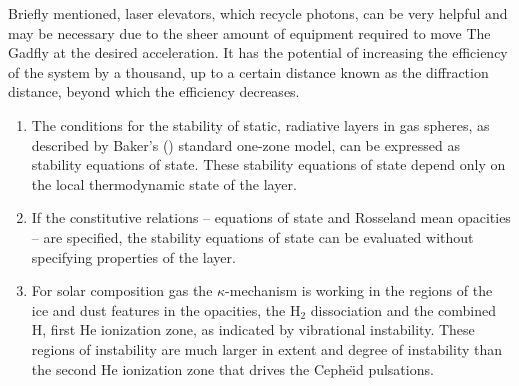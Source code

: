 \documentclass{aa}
\begin{document}
     Briefly mentioned, laser elevators, which recycle photons, can be very helpful and may be necessary due to the sheer amount of equipment required to move The Gadfly at the desired acceleration. It has the potential of increasing the efficiency of the system by a thousand, up to a certain distance known as the diffraction distance, beyond which the efficiency decreases.
   \begin{enumerate}
      \item The conditions for the stability of static, radiative
         layers in gas spheres, as described by Baker's (\cite{baker})
         standard one-zone model, can be expressed as stability
         equations of state. These stability equations of state depend
         only on the local thermodynamic state of the layer.
      \item If the constitutive relations -- equations of state and
         Rosseland mean opacities -- are specified, the stability
         equations of state can be evaluated without specifying
         properties of the layer.
      \item For solar composition gas the $\kappa$-mechanism is
         working in the regions of the ice and dust features
         in the opacities, the $\mathrm{H}_2$ dissociation and the
         combined H, first He ionization zone, as
         indicated by vibrational instability. These regions
         of instability are much larger in extent and degree of
         instability than the second He ionization zone
         that drives the Cephe{\"\i}d pulsations.
   \end{enumerate}

\begin{acknowledgements}
\end{acknowledgements}



\begin{thebibliography}{}

  
\end{thebibliography}
\end{document}
